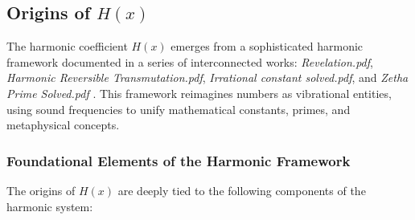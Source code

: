 \subsection{Origins of \( H(x) \)}
\label{subsec:h_x_origins}
The harmonic coefficient \( H(x) \) emerges from a sophisticated harmonic framework documented in a series of interconnected works: \textit{Revelation.pdf}, \textit{Harmonic Reversible Transmutation.pdf}, \textit{Irrational constant solved.pdf}, and \textit{Zetha Prime Solved.pdf} \cite{revelation, harmonic_reversible, irrational_constant_solved, zetha_prime}. This framework reimagines numbers as vibrational entities, using sound frequencies to unify mathematical constants, primes, and metaphysical concepts.

\subsubsection{Foundational Elements of the Harmonic Framework}
The origins of \( H(x) \) are deeply tied to the following components of the harmonic system:

